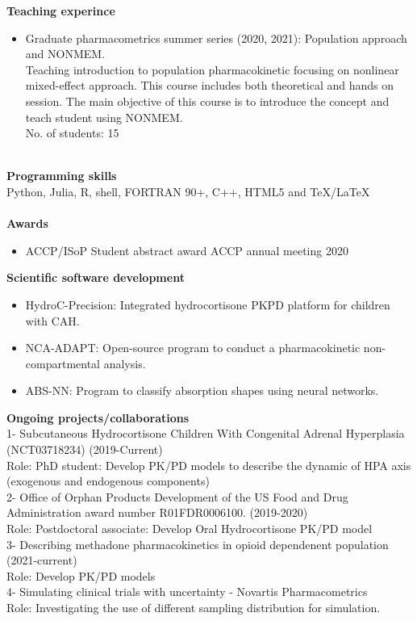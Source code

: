 \documentclass[a4paper,11pt]{article}
\begin{document}
\textbf{Teaching experince} \\
\begin{itemize}
\item Graduate pharmacometrics summer series (2020, 2021): Population approach and NONMEM.
~\\
Teaching introduction to population pharmacokinetic focusing on nonlinear mixed-effect approach. This course includes both theoretical and hands on session. The main objective of this course is to introduce the concept and teach student using NONMEM.
~\\
No. of students: 15
\end{itemize}
~\\
\textbf{Programming skills}
~\\
Python, Julia, R, shell, FORTRAN 90+, C++, HTML5 and \TeX/\LaTeX\\
~\\
\textbf{Awards} \\

\begin{itemize}
\item ACCP/ISoP Student abstract award \hfill ACCP annual meeting 2020
\end{itemize}

\textbf{Scientific software development} \\
\begin{itemize}
\item HydroC-Precision: Integrated hydrocortisone PKPD platform for children with CAH.
\item NCA-ADAPT: Open-source program to conduct a pharmacokinetic non-compartmental analysis.
\item ABS-NN: Program to classify absorption shapes using neural networks.
\end{itemize}

\textbf{Ongoing projects/collaborations}\\
1- Subcutaneous Hydrocortisone Children With Congenital Adrenal Hyperplasia (NCT03718234) (2019-Current)
~\\
Role: PhD student: Develop PK/PD models to describe the dynamic of HPA axis (exogenous and endogenous components)
~\\
2- Office of Orphan Products Development of the US Food and Drug Administration award number R01FDR0006100. (2019-2020)
~\\
Role: Postdoctoral associate: Develop Oral Hydrocortisone PK/PD model
~\\
3- Describing methadone pharmacokinetics in opioid dependenent population (2021-current)
~\\
Role: Develop PK/PD models
~\\
4- Simulating clinical trials with uncertainty - Novartis Pharmacometrics
~\\
Role: Investigating the use of different sampling distribution for simulation.
~\\
\nocite{*}
\printbibliography[title=Publications, keyword=papers]
\end{document}
